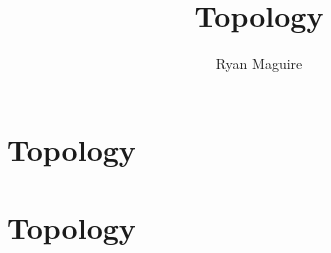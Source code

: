\documentclass[crop=false,class=book,oneside]{standalone}
\begin{document}
    \ifx\ifmathcourses\undefined
        \title{Topology}
        \author{Ryan Maguire}
        \date{\vspace{-5ex}}
        \maketitle
        \tableofcontents
        \chapter*{Topology}
        \setcounter{chapter}{1}
    \else
        \chapter{Topology}
    \fi
\end{document}
